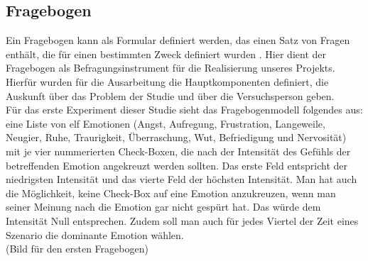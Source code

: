 \subsection{Fragebogen} \label{fragebogen-1}


Ein Fragebogen kann als Formular definiert werden, das einen Satz von Fragen enthält, die für einen bestimmten Zweck definiert wurden \cite{gault-questionnaire}.
Hier dient der Fragebogen als Befragungsinstrument für die Realisierung unseres Projekts. Hierfür wurden fü­r die Ausarbeitung die Hauptkomponenten definiert, die Auskunft über das Problem der Studie und über die Versuchsperson geben. \\

Für das erste Experiment dieser Studie sieht das Fragebogenmodell folgendes aus: eine Liste von elf Emotionen (Angst, Aufregung, Frustration, Langeweile, Neugier, Ruhe, Traurigkeit, Überraschung, Wut, Befriedigung und Nervosität) mit je vier nummerierten  Check-Boxen, die nach der Intensität des Gefühls der betreffenden Emotion angekreuzt werden sollten. Das erste Feld entspricht der niedrigsten Intensität und das vierte Feld der höchsten Intensität. Man hat auch die Möglichkeit, keine Check-Box auf eine Emotion anzukreuzen, wenn man seiner Meinung nach die Emotion gar nicht gespürt hat. Das würde dem Intensität Null entsprechen. Zudem soll man auch für jedes Viertel der Zeit eines Szenario die dominante Emotion wählen. \\

(Bild für den ersten Fragebogen) \\
